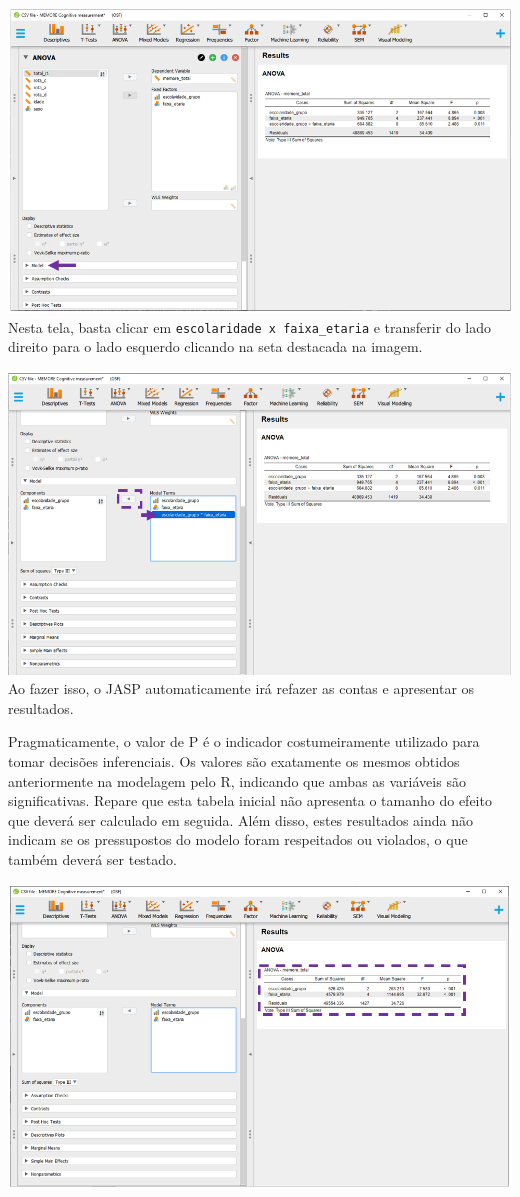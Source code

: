 \documentclass[
]{book}
\begin{document}
\includegraphics{./img/cap_anova_two_way_model_interface.png} Nesta
tela, basta clicar em \texttt{escolaridade\ x\ faixa\_etaria} e
transferir do lado direito para o lado esquerdo clicando na seta
destacada na imagem.

\includegraphics{./img/cap_anova_two_way_model2.png} Ao fazer isso, o
JASP automaticamente irá refazer as contas e apresentar os resultados.

Pragmaticamente, o valor de P é o indicador costumeiramente utilizado
para tomar decisões inferenciais. Os valores são exatamente os mesmos
obtidos anteriormente na modelagem pelo R, indicando que ambas as
variáveis são significativas. Repare que esta tabela inicial não
apresenta o tamanho do efeito que deverá ser calculado em seguida. Além
disso, estes resultados ainda não indicam se os pressupostos do modelo
foram respeitados ou violados, o que também deverá ser testado.

\includegraphics{./img/cap_anova_two_way_resultados.png}
\end{document}
